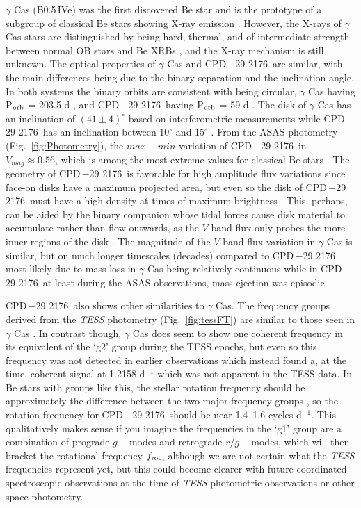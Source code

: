 \documentclass[]{aastex631}
\newcommand{\target}{CPD\,$-$29 2176}
\begin{document}
$\gamma$ Cas (B0.5\,IVe) was the first discovered Be star \citep{1866AN.....68...63S} and is the prototype of a subgroup of classical Be stars showing X-ray emission \citep{2020MNRAS.493.2511N}. However, the X-rays of $\gamma$ Cas stars are distinguished by being hard, thermal, and of intermediate strength between normal OB stars and Be XRBs \citep{2006A&A...454..265L}, and the X-ray mechanism is still unknown. The optical properties of $\gamma$ Cas and \target\ are similar, with the main differences being due to the binary separation and the inclination angle. In both systems the binary orbits are consistent with being circular, $\gamma$ Cas having P$_{\rm orb}$ = 203.5 d \citep{2012A&A...540A..53S, Nermravov}, and \target\ having P$_{\rm orb}$ = 59 d \citep{noel}. The disk of $\gamma$ Cas has an inclination of $(41\pm4)^\circ$ based on interferometric measurements \citep{2012A&A...545A..59S} while \target\ has an inclination between 10$^\circ$ and 15$^\circ$ \citep{noel}. From the ASAS photometry (Fig.~\ref{fig:Photometry}), the $max - min$ variation of \target\ in $V_{mag} \approx 0.56$, which is among the most extreme values for classical Be stars \citep{2018MNRAS.479.2909B}. The geometry of \target\ is favorable for high amplitude flux variations since face-on disks have a maximum projected area, but even so the disk of \target\ must have a high density at times of maximum brightness \citep{2012ApJ...756..156H}. This, perhaps, can be aided by the binary companion whose tidal forces cause disk material to accumulate rather than flow outwards, as the $V$ band flux only probes the more inner regions of the disk \citep{2015MNRAS.454.2107V}. The magnitude of the $V$ band flux variation in $\gamma$ Cas is similar, but on much longer timescales (decades) compared to \target\, most likely due to mass loss in $\gamma$ Cas being relatively continuous while in \target\, at least during the ASAS observations, mass ejection was episodic.






\target\ also shows other similarities to $\gamma$ Cas. The frequency groups derived from the \textit{TESS} photometry (Fig.~\ref{fig:tessFT}) are similar to those seen in $\gamma$ Cas \citep{Labadie}. In contrast though, $\gamma$ Cas does seem to show one coherent frequency in its equivalent of the `g2' group during the TESS epochs, but even so this frequency was not detected in earlier observations \citep{HenrySmith} which instead found a, at the time, coherent signal at 1.2158 d$^{-1}$ which was not apparent in the TESS data. In Be stars with groups like this, the stellar rotation frequency should be approximately the difference between the two major frequency groups \citep{2018A&A...613A..70S}, so the rotation frequency for \target\ should be near 1.4--1.6 cycles d$^{-1}$.
This qualitatively makes sense if you imagine the frequencies in the `g1' group are a combination of prograde $g-$modes and retrograde $r/g-$modes, which will then bracket the rotational frequency $f_{\rm rot}$, although we are not certain what the \textit{TESS} frequencies represent yet, but this could become clearer with future coordinated spectroscopic observations at the time of \textit{TESS} photometric observations or other space photometry.
\end{document}

